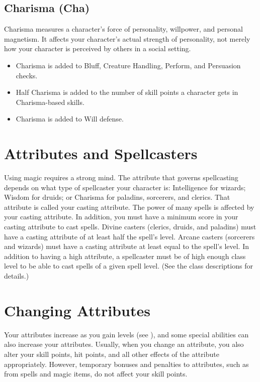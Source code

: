 \subsection{Charisma (Cha)}
Charisma measures a character's force of personality, willpower, and personal magnetism. It affects your character's actual strength of personality, not merely how your character is perceived by others in a social setting.
\begin{itemize}
    \item Charisma is added to Bluff, Creature Handling, Perform, and Persuasion checks.
    \item Half Charisma is added to the number of skill points a character gets in Charisma-based skills.
    \item Charisma is added to Will defense.
\end{itemize}

\section{Attributes and Spellcasters}
Using magic requires a strong mind. The attribute that governs spellcasting depends on what type of spellcaster your character is: Intelligence for wizards; Wisdom for druids; or Charisma for paladins, sorcerers, and clerics. That attribute is called your casting attribute. The power of many spells is affected by your casting attribute. In addition, you must have a minimum score in your casting attribute to cast spells. Divine casters (clerics, druids, and paladins) must have a casting attribute of at least half the spell's level. Arcane casters (sorcerers and wizards) must have a casting attribute at least equal to the spell's level. In addition to having a high attribute, a spellcaster must be of high enough class level to be able to cast spells of a given spell level. (See the class descriptions for details.)

\section{Changing Attributes}

Your attributes increase as you gain levels (see ), and some special abilities can also increase your attributes. Usually, when you change an attribute, you also alter your skill points, hit points, and all other effects of the attribute appropriately. However, temporary bonuses and penalties to attributes, such as from spells and magic items, do not affect your skill points.

